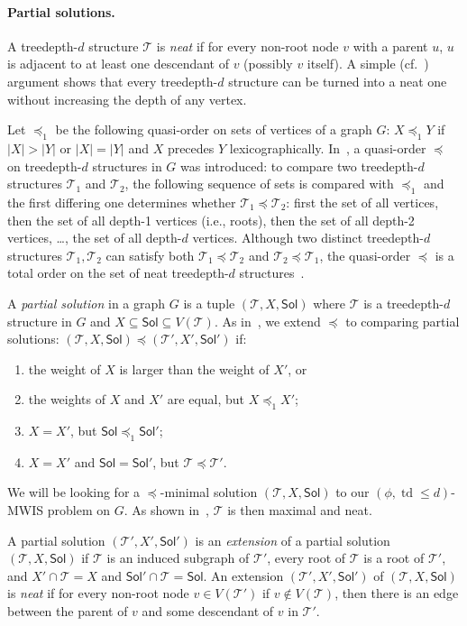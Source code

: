 \documentclass[11pt,a4paper]{article}
\DeclareMathOperator{\td}{td}
\theoremstyle{definition}
\def\T{\mathcal{T}}
\def\Sol{\mathsf{Sol}}
\begin{document}
\paragraph{Partial solutions.}
A treedepth-$d$ structure $\T$ is \emph{neat} if for every non-root node $v$
with a parent $u$, $u$ is adjacent to at least one descendant of $v$ (possibly $v$ itself).
A simple (cf.~\cite{DBLP:conf/soda/ChudnovskyMPPR24}) argument shows that every treedepth-$d$ structure
can be turned into a neat one without increasing the depth of any vertex.

Let $\preceq_1$ be the following quasi-order on sets
of vertices of a graph $G$: $X \preceq_1 Y$ if $|X| > |Y|$ or
$|X| = |Y|$ and $X$ precedes $Y$ lexicographically. 
In~\cite{DBLP:conf/soda/ChudnovskyMPPR24}, a quasi-order $\preceq$ on treedepth-$d$ structures in
$G$ was introduced: to compare two treedepth-$d$ structures $\T_1$ and $\T_2$,
the following sequence of sets is compared with $\preceq_1$ and the first
differing one determines whether $\T_1 \preceq \T_2$: first the set of all vertices,
then the set of all depth-1 vertices (i.e., roots), then the
set of all depth-2 vertices, \ldots, the set of all depth-$d$ vertices. 
Although two distinct treedepth-$d$ structures $\T_1,\T_2$ can satisfy both
$\T_1 \preceq \T_2$ and $\T_2 \preceq \T_1$, the quasi-order $\preceq$
is a total order on the set of neat treedepth-$d$ structures~\cite{DBLP:conf/soda/ChudnovskyMPPR24}.

A \emph{partial solution} in a graph $G$ is a tuple $(\T,X,\Sol)$
where $\T$ is a treedepth-$d$ structure in $G$ and $X \subseteq \Sol \subseteq V(\T)$.
As in~\cite{DBLP:conf/soda/ChudnovskyMPPR24}, we extend $\preceq$ to comparing partial solutions:
$(\T,X,\Sol) \preceq (\T',X',\Sol')$ if:
\begin{enumerate}[nosep]
    \item the weight of $X$ is larger than the weight of $X'$, or
    \item the weights of $X$ and $X'$ are equal, but $X \preceq_1 X'$;
    \item $X = X'$, but $\Sol \preceq_1 \Sol'$;
    \item $X = X'$ and $\Sol = \Sol'$, but $\T \preceq \T'$.
\end{enumerate}
We will be looking for a $\preceq$-minimal solution $(\T,X,\Sol)$
to our $(\phi,\td \leq d)$-\textsc{MWIS} problem on $G$.
As shown in~\cite{DBLP:conf/soda/ChudnovskyMPPR24}, $\T$ is then maximal and neat.

A partial solution $(\T', X', \Sol')$ is an \emph{extension} of a partial solution $(\T, X, \Sol)$ if $\T$ is an induced subgraph of $\T'$, every root of $\T$ is a root of $\T'$, and $X' \cap \T = X$ and $\Sol' \cap \T = \Sol$. 
An extension $(\T',X',\Sol')$ of $(\T,X,\Sol)$ is \emph{neat} if 
for every non-root node $v \in V(\T')$ if $v \notin V(\T)$, then 
there is an edge between the parent of $v$ and some descendant of $v$ in $\T'$. 
\end{document}
